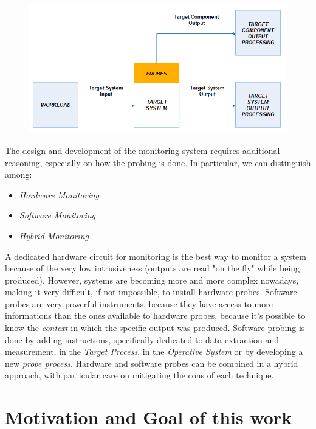 \begin{figure}[h!]
	\includegraphics[width=\textwidth]{img/white-box.png}
	\caption{}
\end{figure}

The design and development of the monitoring system requires additional reasoning, especially on how the probing is done. In particular, we can distinguish among:

\begin{itemize}
	\item \textsl{Hardware Monitoring}
	\item \textsl{Software Monitoring}
	\item \textsl{Hybrid Monitoring}
\end{itemize}

A dedicated hardware circuit for monitoring is the best way to monitor a system because of the very low intrusiveness (outputs are read "on the fly" while being produced). However, systems are becoming more and more complex nowadays, making it very difficult, if not impossible, to install hardware probes.
Software probes are very powerful instruments, because they have access to more informations than the ones available to hardware probes, because it's possible to know the \textsl{context} in which the specific output was produced.
Software probing is done by adding instructions, specifically dedicated to data extraction and measurement,  in the \textsl{Target Process}, in the \textsl{Operative System} or by developing a new \textsl{probe process}.
Hardware and software probes can be combined in a hybrid approach, with particular care on mitigating the cons of each technique.

\section{Motivation and Goal of this work}

